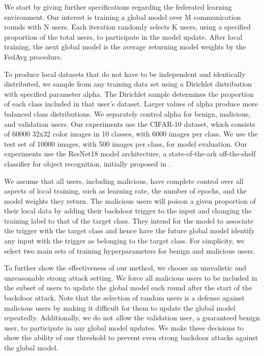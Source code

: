 \documentclass{article} %
\begin{document}
We start by giving further specifications regarding the federated learning environment. Our interest is training a global model over M communication rounds with N users. Each iteration randomly selects K users, using a specified proportion of the total users, to participate in the model update. After local training, the next global model is the average returning model weights by the FedAvg procedure. 

To produce local datasets that do not have to be independent and identically distributed, we sample from any training data set using a Dirichlet distribution with specified parameter alpha. The Dirichlet sample determines the proportion of each class included in that user's dataset. Larger values of alpha produce more balanced class distributions. We separately control alpha for benign, malicious, and validation users. Our experiments use the CIFAR-10 dataset, which consists of 60000 32x32 color images in 10 classes, with 6000 images per class. We use the test set of 10000 images, with 500 images per class, for model evaluation. Our experiments use the ResNet18 model architecture, a state-of-the-ark off-the-shelf classifier for object recognition, initially proposed in \cite{resnet}. 

We assume that all users, including malicious, have complete control over all aspects of local training, such as learning rate, the number of epochs, and the model weights they return. The malicious users will poison a given proportion of their local data by adding their backdoor trigger to the input and changing the training label to that of the target class. They intend for the model to associate the trigger with the target class and hence have the future global model identify any input with the trigger as belonging to the target class. For simplicity, we select two main sets of training hyperparameters for benign and malicious users. 

To further show the effectiveness of our method, we choose an unrealistic and unreasonable strong attack setting. We force all malicious users to be included in the subset of users to update the global model each round after the start of the backdoor attack. Note that the selection of random users is a defense against malicious users by making it difficult for them to update the global model repeatedly. Additionally, we do not allow the validation user, a guaranteed benign user, to participate in any global model updates. We make these decisions to show the ability of our threshold to prevent even strong backdoor attacks against the global model. 
\end{document}
